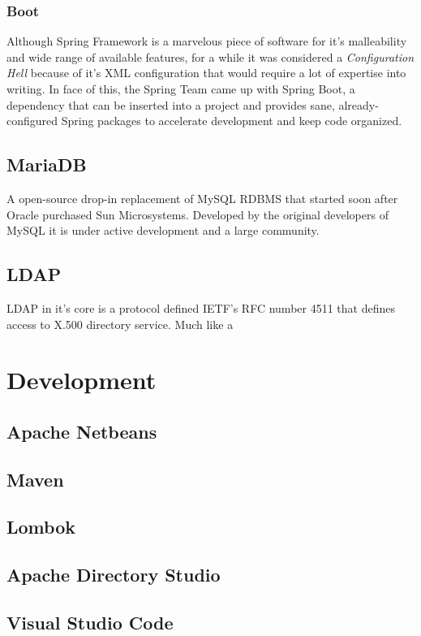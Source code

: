 \subsubsection{Boot}
Although Spring Framework is a marvelous piece of software for it's malleability and wide range of available features, for a while it was considered a \textit{Configuration Hell} because of it's \gls{XML} configuration that would require a lot of expertise into writing\cite{xmlhell1}\cite{xmlhell2}\cite{xmlhell3}\cite{xmlhell4}\cite{xmlhell5}. In face of this, the Spring Team came up with Spring Boot, a dependency that can be inserted into a project and provides sane, already-configured Spring packages to accelerate development and keep code organized.

\subsection{MariaDB}
A open-source drop-in replacement of MySQL \gls{RDBMS}\cite{mariadb} that started soon after Oracle purchased Sun Microsystems\cite{mariadbfuture}. Developed by the original developers of MySQL it is under active development and a large community\cite{mariadbgit}.

\subsection{LDAP}
\gls{LDAP} in it's core is a protocol defined \gls{IETF}'s \gls{RFC} number 4511\cite{ldaprfc} that defines access to X.500 directory service. Much like  a 

\section{Development}
\subsection{Apache Netbeans}
\subsection{Maven}
\subsection{Lombok}
\subsection{Apache Directory Studio}
\subsection{Visual Studio Code}
